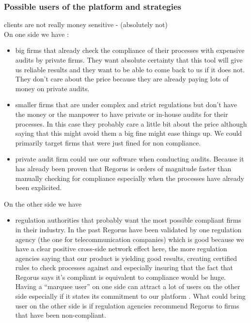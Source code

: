 \documentclass[10pt]{report}
\begin{document}
\subsubsection{Possible users of the platform and strategies}
clients are not really money sensitive - (absolutely not)\\
On one side we have :
\begin{itemize}
\item big firms that already check the compliance of their processes with expensive audits by private firms. They want absolute certainty that this tool will give us reliable results and they want to be able to come back to us if it does not. They don't care about the price because they are already paying lots of money on private audits.
\item smaller firms that are under complex and strict regulations but don't have the money or the manpower to have private or in-house audits for their processes. In this case they probably care a little bit about the price although saying that this might avoid them a big fine might ease things up. We could primarily target firms that were just fined for non compliance.
\item private audit firm could use our software when conducting audits. Because it has already been proven that Regorus is orders of magnitude faster than manually checking for compliance especially when the processes have already been explicited.
\end{itemize}

On the other side we have
\begin{itemize}
\item regulation authorities that probably want the most possible compliant firms in their industry. In the past Regorus have been validated by one regulation agency (the one for telecommunication companies) which is good because we have a clear positive cross-side network effect here, the more regulation agencies saying that our product is yielding good results, creating certified rules to check processes against and especially insuring that the fact that Regorus says it's compliant is equivalent to compliance would be huge. Having a \enquote{marquee user} on one side can attract a lot of users on the other side especially if it states its commitment to our platform \autocite{eisenmann2006strategies}. What could bring user on the other side is if regulation agencies recommend Regorus to firms that have been non-compliant. 
\end{itemize}
\end{document}
